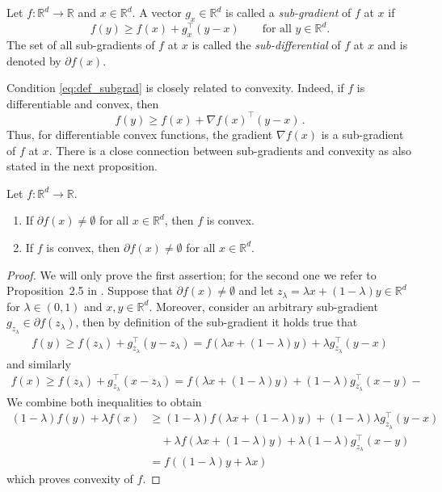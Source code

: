 \documentclass[12pt,openany]{book}
\theoremstyle{definition}
\theoremstyle{definition}
\newcommand{\R}{\mathbb{R}}
\begin{document}
\begin{defi}
Let $f:\R^d\to\R$ and $x\in\R^d$. A vector $g_x\in\R^d$ is called a \textit{sub-gradient} of $f$ at $x$ if
\begin{equation}\label{eq:def_subgrad}
f(y)\geq f(x)+g_x^\top(y-x)
\qquad \text{for all } y\in\R^d.
\end{equation}
The set of all sub-gradients of $f$ at $x$ is called the \textit{sub-differential} of $f$ at $x$ and is denoted by
$\partial f(x)$.
\end{defi}
Condition \eqref{eq:def_subgrad} is closely related to convexity. Indeed, if $f$ is differentiable and convex, then
\[f(y) \ge f(x) + \nabla f(x)^\top (y-x)\,. \]
Thus, for differentiable convex functions, the gradient $\nabla f(x)$ is a sub-gradient of $f$ at $x$.
There is a close connection between sub-gradients and convexity as also stated in the next proposition.
\begin{prop}
Let
$f:\R^d\to\R$.
\begin{enumerate}
\item If $\partial f(x)\neq \emptyset$ for all $x\in \R^d$, then $f$ is convex. 
\item If $f$ is convex, then $\partial f(x)\neq \emptyset$ for all $x\in\R^d$.
\end{enumerate}
\end{prop}
\begin{proof}
We will only prove the first assertion; for the second one we refer to Proposition~2.5 in \cite{Lan2021}. Suppose that $\partial f(x)\neq\emptyset$ and let $z_\lambda = \lambda x+(1-\lambda) y\in \R^d$ for $\lambda\in(0,1)$ and $x,y\in \R^d$. Moreover, consider an arbitrary sub-gradient $g_{z_\lambda}\in\partial f(z_\lambda)$, then by definition of the sub-gradient it holds true that
\begin{align*}
f(y) \ge f(z_\lambda) + g_{z_\lambda}^\top (y-z_\lambda)=f(\lambda x+(1-\lambda)y)+ \lambda g_{z_\lambda}^\top (y-x)
\end{align*}
and similarly
\begin{align*}
f(x) \ge f(z_\lambda) + g_{z_\lambda}^\top (x-z_\lambda)=f(\lambda x+(1-\lambda)y)+ (1-\lambda) g_{z_\lambda}^\top (x-y)-
\end{align*}
We combine both inequalities to obtain
\begin{align*} 
(1-\lambda) f(y) + \lambda f(x) &\ge (1-\lambda) f(\lambda x+(1-\lambda)y)+(1-\lambda) \lambda g_{z_\lambda}^\top (y-x)\\&\quad + \lambda f(\lambda x+ (1-\lambda)y) + \lambda (1-\lambda) g_{z_\lambda}^\top (x-y)\\ &= f((1-\lambda) y + \lambda x) 
\end{align*}
which proves convexity of $f$. 
\end{proof}
\end{document}
